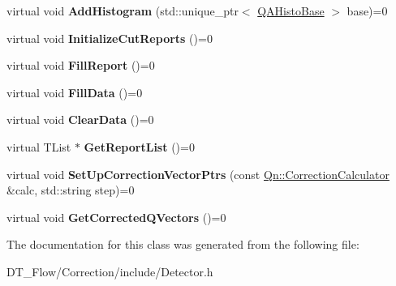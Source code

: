 \begin{DoxyCompactItemize}
virtual void {\bfseries Add\+Histogram} (std\+::unique\+\_\+ptr$<$ \mbox{\hyperlink{structQn_1_1QAHistoBase}{Q\+A\+Histo\+Base}} $>$ base)=0
\item 
\mbox{\label{classQn_1_1DetectorBase_a777b04c1abfff3d28caecf0cb86fb3e7}} 
virtual void {\bfseries Initialize\+Cut\+Reports} ()=0
\item 
\mbox{\label{classQn_1_1DetectorBase_aad5889793f34ee5c80a4fc7471cd8b96}} 
virtual void {\bfseries Fill\+Report} ()=0
\item 
\mbox{\label{classQn_1_1DetectorBase_ad18b602694b1cd392c63d2f456e02377}} 
virtual void {\bfseries Fill\+Data} ()=0
\item 
\mbox{\label{classQn_1_1DetectorBase_a8833f5bd09a569bf3795058c3e4da528}} 
virtual void {\bfseries Clear\+Data} ()=0
\item 
\mbox{\label{classQn_1_1DetectorBase_a1399c579dcc65d191bd92a3edeb9d6fe}} 
virtual T\+List $\ast$ {\bfseries Get\+Report\+List} ()=0
\item 
\mbox{\label{classQn_1_1DetectorBase_aa9d6c4d75884271c2af8fff506f84207}} 
virtual void {\bfseries Set\+Up\+Correction\+Vector\+Ptrs} (const \mbox{\hyperlink{classQn_1_1CorrectionCalculator}{Qn\+::\+Correction\+Calculator}} \&calc, std\+::string step)=0
\item 
\mbox{\label{classQn_1_1DetectorBase_aedb870c235ad5f03630b6670ebd2b151}} 
virtual void {\bfseries Get\+Corrected\+Q\+Vectors} ()=0
\end{DoxyCompactItemize}


The documentation for this class was generated from the following file\+:\begin{DoxyCompactItemize}
\item 
D\+T\+\_\+\+Flow/\+Correction/include/Detector.\+h\end{DoxyCompactItemize}
